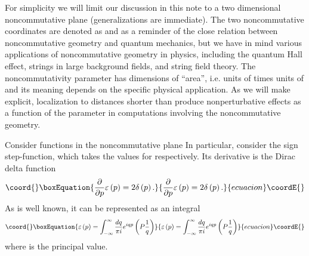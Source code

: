 \documentclass[a4paper,12pt]{article}
\begin{document}
For simplicity we will limit our discussion in this note to a two
dimensional noncommutative plane (generalizations are immediate). The two
noncommutative coordinates are denoted as \coordHE{} and \coordHE{} as a
reminder of the close relation between noncommutative geometry and quantum
mechanics, but we have in mind various applications of noncommutative
geometry in physics, including the quantum Hall effect, strings in large
background fields, and string field theory. The noncommutativity parameter \myHighlight{$%
\theta $}\coordHE{} has dimensions of ``area'', i.e. units of \coordHE{} times units of \coordHE{}
and its meaning depends on the specific physical application. As we will
make explicit, localization to distances shorter than \myHighlight{$\sqrt{\theta }$}\coordHE{}
produce nonperturbative effects as a function of the parameter \myHighlight{$\theta $}\coordHE{} in
computations involving the noncommutative geometry.

Consider functions in the noncommutative plane \coordHE{}
In particular, consider the sign step-function, \coordHE{} which takes the values \coordHE{} for \coordHE{} respectively. Its derivative is the Dirac delta function
\begin{equation}\coord{}\boxEquation{
\frac{\partial }{\partial p}\varepsilon \left( p\right) =2\delta \left(
p\right) .
}{
\frac{\partial }{\partial p}\varepsilon \left( p\right) =2\delta \left(
p\right) .
}{ecuacion}\coordE{}\end{equation}
As is well known, it can be represented as an integral
\begin{equation}\coord{}\boxEquation{
\varepsilon \left( p\right) =\int_{-\infty }^{\infty }\frac{dq}{\pi i}
e^{iqp}\left( P\frac{1}{q}\right)
}{
\varepsilon \left( p\right) =\int_{-\infty }^{\infty }\frac{dq}{\pi i}
e^{iqp}\left( P\frac{1}{q}\right)
}{ecuacion}\coordE{}\end{equation}
where \coordHE{} is the principal value.
\end{document}
